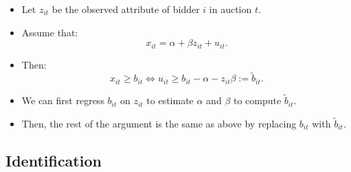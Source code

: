 \documentclass[
]{book}
\providecommand{\tightlist}{%
  \setlength{\itemsep}{0pt}\setlength{\parskip}{0pt}}
\begin{document}
\begin{itemize}
\tightlist
\item
  Let \(z_{it}\) be the observed attribute of bidder \(i\) in auction \(t\).
\item
  Assume that:
  \[
  x_{it} = \alpha + \beta z_{it} + u_{it}.
  \]
\item
  Then:
  \[
  x_{it} \ge b_{it} \Leftrightarrow u_{it} \ge b_{it} - \alpha - z_{it} \beta := \tilde{b}_{it}.
  \]
\item
  We can first regress \(b_{it}\) on \(z_{it}\) to estimate \(\alpha\) and \(\beta\) to compute \(\tilde{b}_{it}\).
\item
  Then, the rest of the argument is the same as above by replacing \(b_{it}\) with \(\tilde{b}_{it}\).
\end{itemize}

\hypertarget{identification}{%
\subsection{Identification}\label{identification}}
\end{document}
